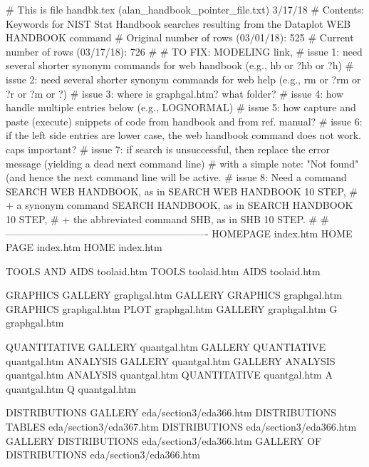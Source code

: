 # This is file handbk.tex   (alan_handbook_pointer_file.txt)   3/17/18
# Contents: Keywords for NIST Stat Handbook searches resulting from the Dataplot     WEB HANDBOOK     command
# Original number of rows (03/01/18): 525
# Current  number of rows (03/17/18): 726
#
# TO FIX: MODELING link,
# issue 1: need several shorter synonym commands for    web handbook (e.g., hb or ?hb or ?h)
# issue 2: need several shorter synonym commands for    web help     (e.g., rm or ?rm or ?r or ?m or ?)
# issue 3: where is graphgal.htm? what folder?
# issue 4: how handle multiple entries below (e.g., LOGNORMAL)
# issue 5: how capture and paste (execute) snippets of code from handbook and from ref. manual?
# issue 6: if the left side entries are lower case, the web handbook command does not work.  caps important?
# issue 7: if search is unsuccessful, then replace the error message (yielding a dead next command line)
#          with a simple note: "Not found" (and hence the next command line will be active.
# issue 8: Need a command             SEARCH WEB HANDBOOK, as in SEARCH WEB HANDBOOK 10 STEP,
#          + a synonym command        SEARCH HANDBOOK,     as in SEARCH HANDBOOK 10 STEP,
#          + the abbreviated command  SHB,                 as in SHB 10 STEP.
#
# -------------------------------------------------------------
HOMEPAGE                                index.htm
HOME PAGE                               index.htm
HOME                                    index.htm

TOOLS AND AIDS                          toolaid.htm
TOOLS                                   toolaid.htm
AIDS                                    toolaid.htm

GRAPHICS GALLERY                        graphgal.htm
GALLERY GRAPHICS                        graphgal.htm
GRAPHICS                                graphgal.htm
PLOT                                    graphgal.htm
GALLERY                                 graphgal.htm
G                                       graphgal.htm

QUANTITATIVE GALLERY                    quantgal.htm
GALLERY QUANTIATIVE                     quantgal.htm
ANALYSIS GALLERY                        quantgal.htm
GALLERY ANALYSIS                        quantgal.htm
ANALYSIS                                quantgal.htm
QUANTITATIVE                            quantgal.htm
A                                       quantgal.htm
Q                                       quantgal.htm

DISTRIBUTIONS GALLERY                   eda/section3/eda366.htm
DISTRIBUTIONS TABLES                    eda/section3/eda367.htm
DISTRIBUTIONS                           eda/section3/eda366.htm
GALLERY DISTRIBUTIONS                   eda/section3/eda366.htm
GALLERY OF DISTRIBUTIONS                eda/section3/eda366.htm

